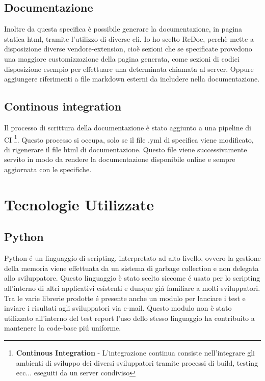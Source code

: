             \subsection{Documentazione\label{apidoc}}
                Inoltre da questa specifica è possibile generare la documentazione, in pagina statica html,
                tramite l'utilizzo di diverse cli.
                Io ho scelto ReDoc, perchè mette a disposizione diverse vendore-extension, cioè sezioni che
                se specificate provedono una maggiore customizzazione della pagina generata, come sezioni di codici disposizione
                esempio per effettuare una determinata chiamata al server.
                Oppure aggiungere riferimenti a file markdown esterni da includere nella documentazione.
                
            \subsection{Continous integration}
                Il processo di scrittura della documentazione è stato aggiunto a una pipeline di CI
                \footnote{\textbf{Continous Integration} - L'integrazione continua consiste nell'integrare gli ambienti di sviluppo dei diversi sviluppatori tramite processi di build, testing ecc... eseguiti da un server condiviso}.
                Questo processo si occupa, solo se il file .yml di specifica viene modificato, di 
                rigenerare il file html di documentazione.
                Questo file viene successivamente servito in modo da rendere la documentazione 
                disponibile online e sempre aggiornata con le specifiche.

    \section{Tecnologie Utilizzate}  
        \subsection{Python}
            Python \'e un linguaggio di scripting, interpretato ad alto livello, ovvero la gestione della memoria viene effettuata da un sistema di garbage collection e non delegata allo sviluppatore.
            Questo linguaggio è stato scelto siccome \'e usato per lo scripting all'interno di altri applicativi esistenti e dunque gi\'a familiare a molti sviluppatori.
            Tra le varie librerie prodotte \'e presente anche un modulo per lanciare i test e inviare i risultati agli sviluppatori via e-mail.
            Questo modulo non è stato utilizzato all'interno del test report l'uso dello stesso linguaggio ha contribuito a mantenere la code-base pi\'u uniforme.

